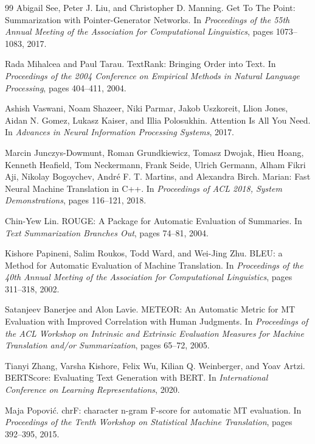 \documentclass[11pt,a4paper]{article}
\begin{document}
\begin{thebibliography}{99}
Abigail See, Peter J. Liu, and Christopher D. Manning.
\newblock Get To The Point: Summarization with Pointer-Generator Networks.
\newblock In \emph{Proceedings of the 55th Annual Meeting of the Association for Computational Linguistics}, pages 1073--1083, 2017.

Rada Mihalcea and Paul Tarau.
\newblock TextRank: Bringing Order into Text.
\newblock In \emph{Proceedings of the 2004 Conference on Empirical Methods in Natural Language Processing}, pages 404--411, 2004.

Ashish Vaswani, Noam Shazeer, Niki Parmar, Jakob Uszkoreit, Llion Jones, Aidan N. Gomez, Lukasz Kaiser, and Illia Polosukhin.
\newblock Attention Is All You Need.
\newblock In \emph{Advances in Neural Information Processing Systems}, 2017.

Marcin Junczys-Dowmunt, Roman Grundkiewicz, Tomasz Dwojak, Hieu Hoang, Kenneth Heafield, Tom Neckermann, Frank Seide, Ulrich Germann, Alham Fikri Aji, Nikolay Bogoychev, Andr{\'e} F. T. Martins, and Alexandra Birch.
\newblock Marian: Fast Neural Machine Translation in C++.
\newblock In \emph{Proceedings of ACL 2018, System Demonstrations}, pages 116--121, 2018.

Chin-Yew Lin.
\newblock ROUGE: A Package for Automatic Evaluation of Summaries.
\newblock In \emph{Text Summarization Branches Out}, pages 74--81, 2004.

Kishore Papineni, Salim Roukos, Todd Ward, and Wei-Jing Zhu.
\newblock BLEU: a Method for Automatic Evaluation of Machine Translation.
\newblock In \emph{Proceedings of the 40th Annual Meeting of the Association for Computational Linguistics}, pages 311--318, 2002.

Satanjeev Banerjee and Alon Lavie.
\newblock METEOR: An Automatic Metric for MT Evaluation with Improved Correlation with Human Judgments.
\newblock In \emph{Proceedings of the ACL Workshop on Intrinsic and Extrinsic Evaluation Measures for Machine Translation and/or Summarization}, pages 65--72, 2005.

Tianyi Zhang, Varsha Kishore, Felix Wu, Kilian Q. Weinberger, and Yoav Artzi.
\newblock BERTScore: Evaluating Text Generation with BERT.
\newblock In \emph{International Conference on Learning Representations}, 2020.

Maja Popovi{\'c}.
\newblock chrF: character n-gram F-score for automatic MT evaluation.
\newblock In \emph{Proceedings of the Tenth Workshop on Statistical Machine Translation}, pages 392--395, 2015.

\end{thebibliography}
\end{document}
